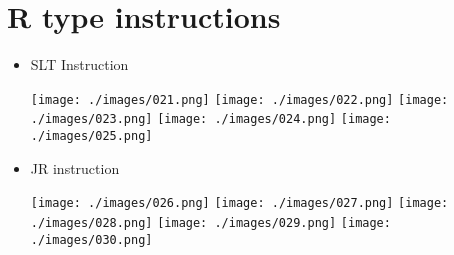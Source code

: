\documentclass[a4paper, 12pt]{article}
\begin{document}
	\newpage
	
	\section{R type instructions}	
	\begin{itemize}
		\item SLT Instruction
		
		\texttt{[image: ./images/021.png]}
		\texttt{[image: ./images/022.png]}
		\texttt{[image: ./images/023.png]}
		\texttt{[image: ./images/024.png]}
		\texttt{[image: ./images/025.png]}
		
		\newpage
		
		\item JR instruction
		
		\texttt{[image: ./images/026.png]}
		\texttt{[image: ./images/027.png]}
		\texttt{[image: ./images/028.png]}
		\texttt{[image: ./images/029.png]}
		\texttt{[image: ./images/030.png]}
		
	\end{itemize}
	
	\newpage
	
\end{document}
